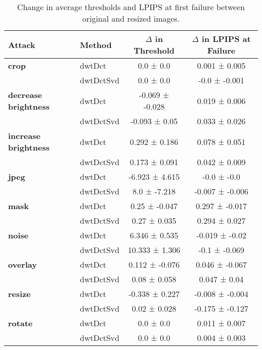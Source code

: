 \begin{table*}[t]
\centering
\begin{tabular}{llcc}
\toprule
\textbf{Attack} & \textbf{Method} & \textbf{$\Delta$ in Threshold} & \textbf{$\Delta$ in LPIPS at Failure} \\
\midrule
\textbf{crop} & dwtDct & 0.0 ± 0.0 & 0.001 ± 0.005 \\
 & dwtDctSvd & 0.0 ± 0.0 & -0.0 ± -0.001 \\
\textbf{decrease brightness} & dwtDct & -0.069 ± -0.028 & 0.019 ± 0.006 \\
 & dwtDctSvd & -0.093 ± 0.05 & 0.033 ± 0.026 \\
\textbf{increase brightness} & dwtDct & 0.292 ± 0.186 & 0.078 ± 0.051 \\
 & dwtDctSvd & 0.173 ± 0.091 & 0.042 ± 0.009 \\
\textbf{jpeg} & dwtDct & -6.923 ± 4.615 & -0.0 ± -0.0 \\
 & dwtDctSvd & 8.0 ± -7.218 & -0.007 ± -0.006 \\
\textbf{mask} & dwtDct & 0.25 ± -0.047 & 0.297 ± -0.017 \\
 & dwtDctSvd & 0.27 ± 0.035 & 0.294 ± 0.027 \\
\textbf{noise} & dwtDct & 6.346 ± 0.535 & -0.019 ± -0.02 \\
 & dwtDctSvd & 10.333 ± 1.306 & -0.1 ± -0.069 \\
\textbf{overlay} & dwtDct & 0.112 ± -0.076 & 0.046 ± -0.067 \\
 & dwtDctSvd & 0.08 ± 0.058 & 0.047 ± 0.04 \\
\textbf{resize} & dwtDct & -0.338 ± 0.227 & -0.008 ± -0.004 \\
 & dwtDctSvd & 0.02 ± 0.028 & -0.175 ± -0.127 \\
\textbf{rotate} & dwtDct & 0.0 ± 0.0 & 0.011 ± 0.007 \\
 & dwtDctSvd & 0.0 ± 0.0 & 0.004 ± 0.003 \\
\bottomrule
\end{tabular}
\caption{Change in average thresholds and LPIPS at first failure between original and resized images.}
\label{tab:original_vs_resized_delta}
\end{table*}